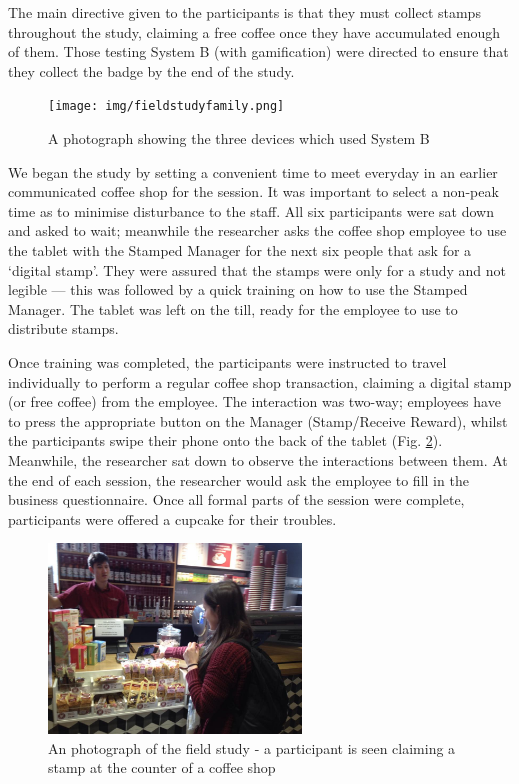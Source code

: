 The main directive given to the participants is that they must collect stamps throughout the study, claiming a free coffee once they have accumulated enough of them. Those testing System B (with gamification) were directed to ensure that they collect the badge by the end of the study. 

\begin{figure}[H]
 \centering
  \texttt{[image: img/fieldstudyfamily.png]}
     \caption{A photograph showing the three devices which used System B}
     \label{fig:fieldstudyfamily}
\end{figure}

We began the study by setting a convenient time to meet everyday in an earlier communicated coffee shop for the session. It was important to select a non-peak time as to minimise disturbance to the staff. All six participants were sat down and asked to wait; meanwhile the researcher asks the coffee shop employee to use the tablet with the Stamped Manager  for the next six people that ask for a `digital stamp'. They were assured that the stamps were only for a study and not legible --- this was followed by a quick training on how to use the Stamped Manager. The tablet was left on the till, ready for the employee to use to distribute stamps.

Once training was completed, the participants were instructed to travel individually to perform a regular coffee shop transaction, claiming a digital stamp (or free coffee) from the employee. The interaction was two-way; employees have to press the appropriate button on the Manager (Stamp/Receive Reward), whilst the participants swipe their phone onto the back of the tablet (Fig. \ref{fig:hollystamping}). Meanwhile, the researcher sat down to observe the interactions between them. At the end of each session, the researcher would ask the employee to fill in the business questionnaire. Once all formal parts of the session were complete, participants were offered a cupcake for their troubles.

\begin{figure}[H]
 \centering
  \includegraphics[width=0.6\textwidth]{img/hollystamping.jpg}	
     \caption{An photograph of the field study - a participant is seen claiming a stamp at the counter of a coffee shop}
     \label{fig:hollystamping}
\end{figure}

